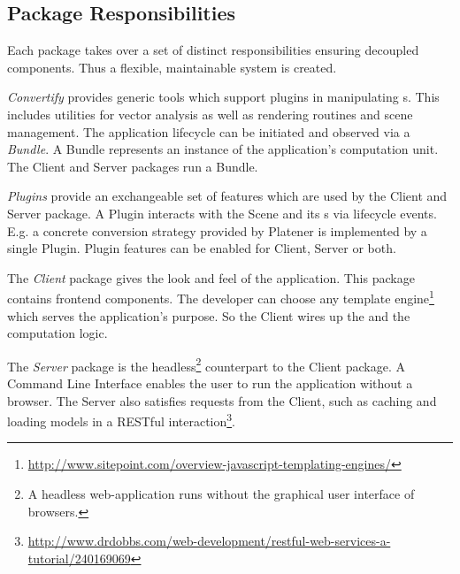 \documentclass[../ClassicThesis.tex]{subfiles}
\begin{document}

\subsection{Package Responsibilities}

Each package takes over a set of distinct responsibilities ensuring decoupled
components. Thus a flexible, maintainable system is created.

\emph{Convertify} provides generic tools which support plugins in manipulating
{\threedmodel}s. This includes utilities for vector analysis as well as
rendering routines and scene management. The application lifecycle can be
initiated and observed via a \emph{Bundle}. A Bundle represents an instance of
the application's computation unit. The Client and Server packages run a Bundle.

\emph{Plugins} provide an exchangeable set of features which are used by the
Client and Server package. A Plugin interacts with the Scene and its
{\threedmodel}s via lifecycle events. E.g. a concrete conversion strategy
provided by Platener is implemented by a single Plugin. Plugin features can be
enabled for Client, Server or both.

The \emph{Client} package gives the look and feel of the application. This
package contains frontend components. The developer can choose any template
engine\footnote{\url{http://www.sitepoint.com/overview-javascript-templating-engines/}}
which serves the application's purpose. So the Client wires up the
{\userinterface} and the computation logic.

The \emph{Server} package is the headless\footnote{A headless web-application
  runs without the graphical user interface of browsers.} counterpart to the
Client package. A Command Line Interface enables the user to run the application
without a browser. The Server also satisfies requests from the Client, such as
caching and loading models in a RESTful
interaction\footnote{\url{http://www.drdobbs.com/web-development/restful-web-services-a-tutorial/240169069}}.
\end{document}
